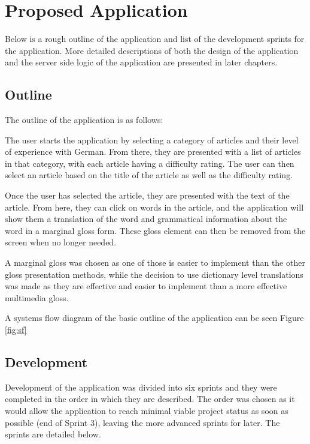 \chapter{Proposed Application}

Below is a rough outline of the application and list of the development sprints for the application. More detailed descriptions of both the design of the application and the server side logic of the application are presented in later chapters. 

\section{Outline}

The outline of the application is as follows: 

The user starts the application by selecting a category of articles and their level of experience with German. From there, they are presented with a list of articles in that category, with each article having a difficulty rating. The user can then select an article based on the title of the article as well as the difficulty rating.

Once the user has selected the article, they are presented with the text of the article. From here, they can click on words in the article, and the application will show them a translation of the word and grammatical information about the word in a marginal gloss form. These gloss element can then be removed from the screen when no longer needed.

A marginal gloss was chosen as one of those is easier to implement than the other gloss presentation methods, while the decision to use dictionary level translations was made as they are effective and easier to implement than a more effective multimedia gloss.

A systems flow diagram of the basic outline of the application can be seen Figure \ref{fig:sf}



\section{Development}

Development of the application was divided into six sprints and they were completed in the order in which they are described. The order was chosen as it would allow the application to reach minimal viable project status as soon as possible (end of Sprint 3), leaving the more advanced sprints for later. The sprints are detailed below.

